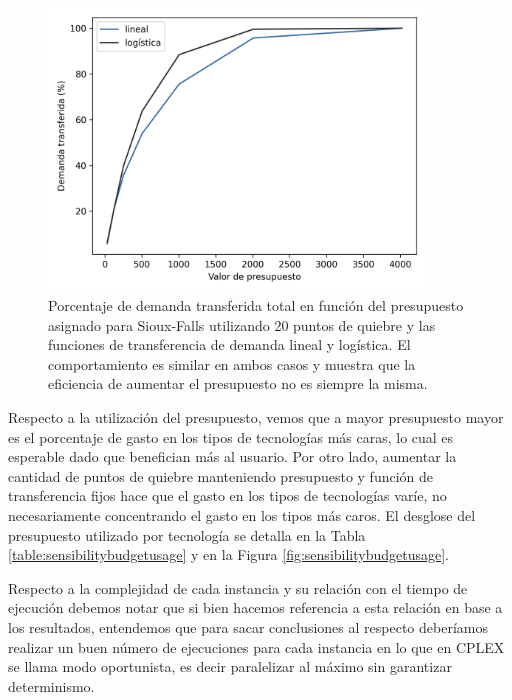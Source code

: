 \begin{figure}[h!]
  \centering
  \includegraphics[width=10cm]{../resources/demand_by_budget.png}
    \caption{Porcentaje de demanda transferida total en función del presupuesto asignado para Sioux-Falls utilizando 20 puntos de quiebre y las funciones de transferencia de demanda lineal y logística. El comportamiento es similar en ambos casos y muestra que la eficiencia de aumentar el presupuesto no es siempre la misma.}
  \label{fig:demandtransferbybudgetlinear}
\end{figure}

Respecto a la utilización del presupuesto, vemos que a mayor presupuesto mayor es el porcentaje de gasto en los tipos de tecnologías más caras, lo cual es esperable dado que benefician más al usuario. Por otro lado, aumentar la cantidad de puntos de quiebre manteniendo presupuesto y función de transferencia fijos hace que el gasto en los tipos de tecnologías varíe, no necesariamente concentrando el gasto en los tipos más caros. El desglose del presupuesto utilizado por tecnología se detalla en la Tabla \ref{table:sensibilitybudgetusage} y en la Figura \ref{fig:sensibilitybudgetusage}.

Respecto a la complejidad de cada instancia y su relación con el tiempo de ejecución debemos notar que si bien hacemos referencia a esta relación en base a los resultados, entendemos que para sacar conclusiones al respecto deberíamos realizar un buen número de ejecuciones para cada instancia en lo que en CPLEX se llama modo oportunista, es decir paralelizar al máximo sin garantizar determinismo.

